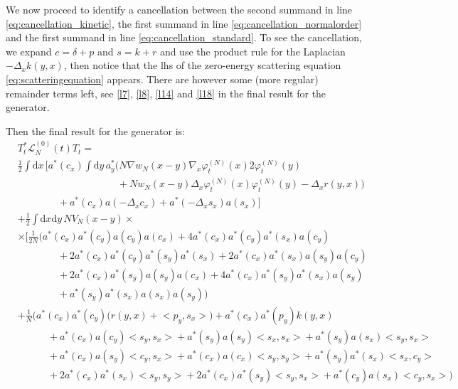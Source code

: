 \documentclass[11pt,a4paper]{scrartcl}
\newcommand{\di}{\textrm{d}}		%
\newcommand{\Lcal}{\mathcal{L}}		%
\newcommand{\scal}[2]{\big<#1,#2\big>} %
\newcommand{\ph}{\varphi_t^{(N)}}	%
\newcommand{\eqr}[1]{\eqref{eq:#1}}			%
\begin{document}
We now proceed to identify a cancellation between the second summand in line \eqr{cancellation_kinetic}, the first summand in line \eqr{cancellation_normalorder} and the first summand in line \eqr{cancellation_standard}. To see the cancellation, we expand $c = \delta + p$ and $s = k + r$ and use the product rule for the Laplacian $-\Delta_x k(y,x)$, then notice that the lhs of the zero-energy scattering equation \eqr{scatteringequation} appears. There are however some (more regular) remainder terms left, see \eqref{l7}, \eqref{l8}, \eqref{l14} and \eqref{l18} in the final result for the generator.

Then the final result for the generator is:
\begin{align}
& T^*_t \Lcal_N^{(0)}(t) T_t = \nonumber \\ 
& \frac{1}{2} \int \di x\, \bigg[ a^*(c_x) \int \di y\, a^*_y \Big( N \nabla w_N(x-y) \nabla_x \ph(x) 2 \ph(y) \label{l7}\\
& \qquad\qquad \qquad\qquad \qquad	+ Nw_N(x-y) \Delta_x \ph(x) \ph(y) - \Delta_x r(y,x) \Big) \label{l8}\\
& \qquad\qquad 			+ a^*(c_x) a(-\Delta_x c_x) + a^*(-\Delta_x s_x) a(s_x) \bigg] \label{l9} \\
& + \frac{1}{2}\int \di x \di y\, NV_N(x-y) \times \nonumber \\
& \times \Big[   \frac{1}{2N}\bigg( a^*(c_x) a^*(c_y) a(c_y) a(c_x) + 4 a^*(c_x) a^*(c_y) a^*(s_x) a(c_y) \label{l10}\\
				      & \qquad\qquad + 2 a^*(c_x) a^*(c_y) a^*(s_y) a^*(s_x) + 2 a^*(c_x) a^*(s_x) a(s_y) a(c_y) \label{l11}\\
				      & \qquad\qquad + 2 a^*(c_x) a^*(s_y) a(s_y) a(c_x) + 4 a^*(c_x) a^*(s_y) a^*(s_x) a(s_y) \label{l12}\\
				      & \qquad\qquad + a^*(s_y) a^*(s_x) a(s_x) a(s_y) \bigg) \label{l13}\\
& + \frac{1}{N}\bigg(   a^*(c_x) a^*(c_y) \Big( r(y,x) + \scal{p_y}{s_x} \Big) + a^*(c_x) a^*(p_y) k(y,x) \label{l14} \\
      & \qquad\quad + a^*(c_x) a(c_y) \scal{s_y}{s_x} + a^*(s_y) a(s_y) \scal{s_x}{s_x} + a^*(s_y) a(s_x) \scal{s_y}{s_x} \label{l15}\\
      & \qquad\quad + a^*(c_x) a(s_y) \scal{c_y}{s_x} + a^*(c_x) a(c_x) \scal{s_y}{s_y} + a^*(s_y) a^*(s_x) \scal{s_x}{c_y} \label{l16}\\
      & \qquad\quad + 2a^*(c_x) a^*(s_x) \scal{s_y}{s_y} + 2a^*(c_x)a^*(s_y) \scal{s_y}{s_x} + a^*(c_y) a(s_x) \scal{c_y}{s_x}    \bigg) \label{l17}\\

\end{align}
\end{document}
